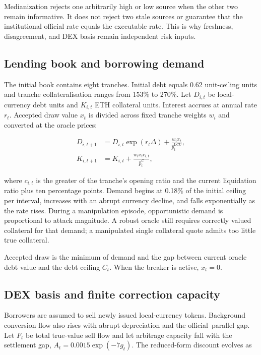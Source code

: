 \documentclass[sn-vancouver,Numbered]{sn-jnl}
\newcommand{\lcu}{\mathrm{LCU}}
\begin{document}
Medianization rejects one arbitrarily high or low source when the other two remain informative. It does not reject two stale sources or guarantee that the institutional official rate equals the executable rate. This is why freshness, disagreement, and DEX basis remain independent risk inputs.

\subsection{Lending book and borrowing demand}

The initial book contains eight tranches. Initial debt equals 0.62 unit-ceiling units and tranche collateralisation ranges from 153\% to 270\%. Let $D_{i,t}$ be local-currency debt units and $K_{i,t}$ ETH collateral units. Interest accrues at annual rate $r_t$. Accepted draw value $x_t$ is divided across fixed tranche weights $w_i$ and converted at the oracle prices:

\begin{align}
 D_{i,t+1}&=D_{i,t}\exp(r_t\Delta)+\frac{w_i x_t}{\widehat p_t^{\lcu}}, \\
 K_{i,t+1}&=K_{i,t}+\frac{w_i x_t c_{i,t}}{\widehat p_t^{C}},
 \label{eq:book}
\end{align}

where $c_{i,t}$ is the greater of the tranche's opening ratio and the current liquidation ratio plus ten percentage points. Demand begins at 0.18\% of the initial ceiling per interval, increases with an abrupt currency decline, and falls exponentially as the rate rises. During a manipulation episode, opportunistic demand is proportional to attack magnitude. A robust oracle still requires correctly valued collateral for that demand; a manipulated single collateral quote admits too little true collateral.

Accepted draw is the minimum of demand and the gap between current oracle debt value and the debt ceiling $C_t$. When the breaker is active, $x_t=0$.

\subsection{DEX basis and finite correction capacity}

Borrowers are assumed to sell newly issued local-currency tokens. Background conversion flow also rises with abrupt depreciation and the official--parallel gap. Let $F_t$ be total true-value sell flow and let arbitrage capacity fall with the settlement gap, $A_t=0.0015\exp(-7g_t)$. The reduced-form discount evolves as
\end{document}
